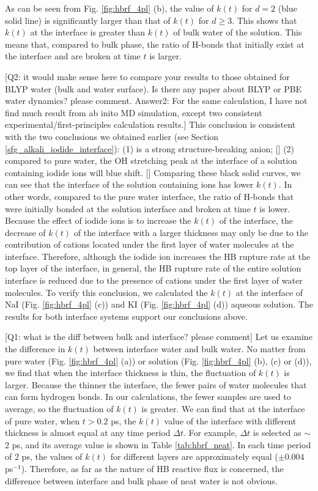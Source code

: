 {\color{blue} As can be seen from Fig. \ref{fig:hbrf_4pl} (b), the value of $k (t)$ for $d = 2$ \A (blue solid line) is significantly larger 
than that of $k(t)$ for $d \ge 3$. This shows that $k(t)$ at the interface is greater than $k(t)$ of bulk water of the solution. 
This means that, compared to bulk phase, the ratio of H-bonds that initially exist at the interface and are broken at time $t$ is larger.

{\color{red}[Q2: it would make sense here to compare your results to those obtained for BLYP water (bulk and water surface). Is there any paper about BLYP or PBE water dynamics? please comment. Answer2: For the same calculation, I have not find much result from ab inito MD simulation, except 
two consistent experimental/first-principles calculation results.]}
This conclusion is consistent with the two conclusions we obtained earlier (see Section \ref{sfg_alkali_iodide_interface}): 
(1) \I is a strong structure-breaking anion; [\cite{Trevani2000}] 
(2) compared to pure water, the OH stretching peak at the interface of a solution containing iodide ions will blue shift. [\cite{Tongraar2010}] 
Comparing these black solid curves, we can see that the interface of the solution containing ions has lower $k(t)$.
In other words, compared to the pure water interface, 
the ratio of H-bonds that were initially bonded at the solution interface and broken at time $t$ is lower.
Because the effect of iodide ions is to increase the $k(t)$ of the interface, the decrease of $k (t)$ of the interface with a larger thickness
may only be due to the contribution of cations located under the first layer of water molecules at the interface. 
Therefore, although the iodide ion increases the HB rupture rate at the top layer of the interface, 
in general, the HB rupture rate of the entire solution interface is reduced due to the presence of cations under the first layer of water molecules. 
To verify this conclusion, we calculated the $k(t)$ at the interface of NaI (Fig. \ref{fig:hbrf_4pl} (c)) and KI (Fig. \ref{fig:hbrf_4pl} (d)) aqueous solution. 
The results for both interface systems support our conclusions above.}

{\color{red}[Q1: what is the diff between bulk and interface? please comment]}
{\color{blue} Let us examine the difference in $k(t)$ between interface water and bulk water. 
No matter from pure water (Fig. \ref{fig:hbrf_4pl} (a)) 
or solution (Fig. \ref{fig:hbrf_4pl} (b), (c) or (d)), we find that when the interface thickness is thin, the fluctuation of $k(t)$ is larger.
Because the thinner the interface, the fewer pairs of water molecules that can form hydrogen bonds. 
In our calculations, the fewer samples are used to average, so the fluctuation of $k (t)$ is greater. 
We can find that at the interface of pure water, when $t> 0.2$ ps, the $k(t)$ value of the interface with different thickness is almost equal 
at any time period $\Delta t$. For example, $\Delta t$ is selected as $\sim$ 2 ps, 
and its average value is shown in Table \ref{tab:hbrf_neat}. In each time period of 2 ps, the values of $k(t)$ for different layers are approximately equal
($\pm 0.004$ ps$^{-1}$). Therefore, as far as the nature of HB reactive flux is concerned, the difference between interface and bulk phase of neat water is not obvious. 
}


